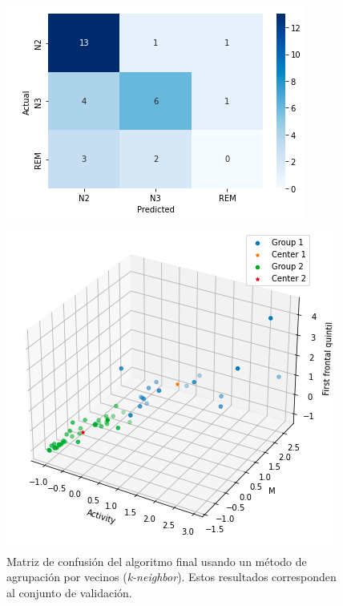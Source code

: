 \documentclass[11pt,letterpaper]{article}
\begin{document}
\begin{justify}
\hfill \\
\begin{figure}[H]
\centering
\begin{minipage}{.48\linewidth}
\vspace{2cm}
	\includegraphics[width=0.9\linewidth]{confusion.png}
	\vspace{1.2cm}
	\caption{\footnotesize{ Matriz de confusión del algoritmo final usando un método de agrupación por vecinos (\textit{k-neighbor}). Estos resultados corresponden al conjunto de validación.}}
	\label{confusion}
\end{minipage}
\hfill
\begin{minipage}{.48\linewidth}
\includegraphics[width=\linewidth]{Disp.png} 

\end{minipage}
\end{figure}
\end{justify}
\end{document}
